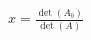 \documentclass[preview]{standalone}
\begin{document}
\begin{align*}
x = \frac{\det(A_b)}{\det(A)}
\end{align*}
\end{document}
